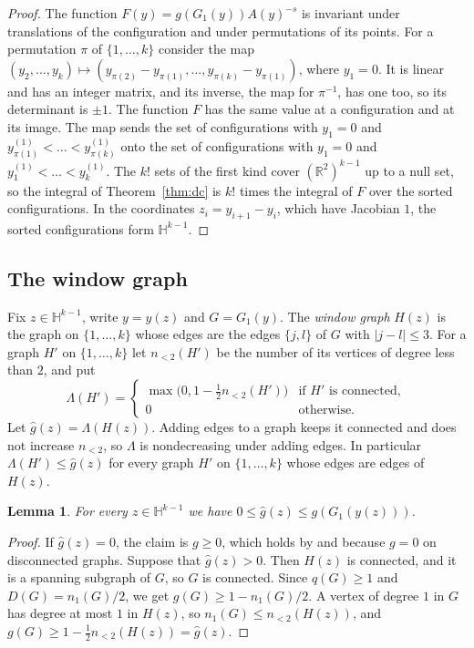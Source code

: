 \documentclass[11pt]{amsart}
\newtheorem{lemma}[theorem]{Lemma}
\theoremstyle{definition}
\theoremstyle{remark}
\numberwithin{equation}{section}
\newcommand{\R}{\mathbb{R}}
\begin{document}
\begin{proof}
The function $F(y)=g(G_1(y))A(y)^{-s}$ is invariant under translations of the configuration and under permutations of its points. For a permutation $\pi$ of $\{1,\dots,k\}$ consider the map $(y_2,\dots,y_k)\mapsto(y_{\pi(2)}-y_{\pi(1)},\dots,y_{\pi(k)}-y_{\pi(1)})$, where $y_1=0$. It is linear and has an integer matrix, and its inverse, the map for $\pi^{-1}$, has one too, so its determinant is $\pm1$. The function $F$ has the same value at a configuration and at its image. The map sends the set of configurations with $y_1=0$ and $y_{\pi(1)}^{(1)}<\dots<y_{\pi(k)}^{(1)}$ onto the set of configurations with $y_1=0$ and $y_1^{(1)}<\dots<y_k^{(1)}$. The $k!$ sets of the first kind cover $(\R^2)^{k-1}$ up to a null set, so the integral of Theorem~\ref{thm:dc} is $k!$ times the integral of $F$ over the sorted configurations. In the coordinates $z_i=y_{i+1}-y_i$, which have Jacobian $1$, the sorted configurations form $\mathbb H^{k-1}$.
\end{proof}

\subsection{The window graph}\label{sec:sweep}
Fix $z\in\mathbb H^{k-1}$, write $y=y(z)$ and $G=G_1(y)$. The \emph{window graph} $H(z)$ is the graph on $\{1,\dots,k\}$ whose edges are the edges $\{j,l\}$ of $G$ with $|j-l|\le3$. For a graph $H'$ on $\{1,\dots,k\}$ let $n_{<2}(H')$ be the number of its vertices of degree less than $2$, and put
\[
\Lambda(H')=\begin{cases}\max\bigl(0,1-\tfrac12n_{<2}(H')\bigr)&\text{if $H'$ is connected},\\0&\text{otherwise.}\end{cases}
\]
Let $\hat g(z)=\Lambda(H(z))$. Adding edges to a graph keeps it connected and does not increase $n_{<2}$, so $\Lambda$ is nondecreasing under adding edges. In particular $\Lambda(H')\le\hat g(z)$ for every graph $H'$ on $\{1,\dots,k\}$ whose edges are edges of $H(z)$.

\begin{lemma}\label{lem:ghat}
For every $z\in\mathbb H^{k-1}$ we have $0\le\hat g(z)\le g(G_1(y(z)))$.
\end{lemma}

\begin{proof}
If $\hat g(z)=0$, the claim is $g\ge0$, which holds by \cite[Lemma~3]{DC26} and because $g=0$ on disconnected graphs. Suppose that $\hat g(z)>0$. Then $H(z)$ is connected, and it is a spanning subgraph of $G$, so $G$ is connected. Since $q(G)\ge1$ and $D(G)=n_1(G)/2$, we get $g(G)\ge1-n_1(G)/2$. A vertex of degree $1$ in $G$ has degree at most $1$ in $H(z)$, so $n_1(G)\le n_{<2}(H(z))$, and $g(G)\ge1-\frac12n_{<2}(H(z))=\hat g(z)$.
\end{proof}
\end{document}
